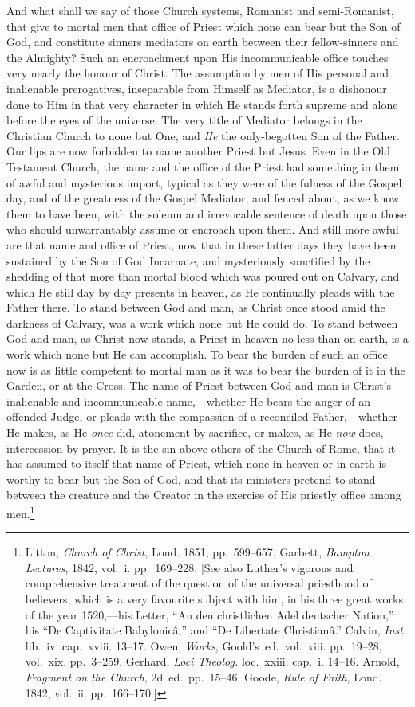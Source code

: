 \documentclass[
  english,
]{book}
\providecommand{\textlatin}{}
\renewcommand{\textlatin}[2][]{\foreignlanguage{latin}{#2}}
\newcommand{\textgerman}[2][]{\foreignlanguage{ngerman}{#2}}
\begin{document}
And what shall we say of those Church systems, Romanist and semi-Romanist, that give to mortal men that office of Priest which none can bear but the Son of God, and constitute sinners mediators on earth between their fellow-sinners and the Almighty? Such an encroachment upon His incommunicable office touches very nearly the honour of Christ. The assumption by men of His personal and inalienable prerogatives, inseparable from Himself as Mediator, is a dishonour done to Him in that very character in which He stands forth supreme and alone before the eyes of the universe. The very title of Mediator belongs in the Christian Church to none but One, and \emph{He} the only-begotten Son of the Father. Our lips are now forbidden to name another Priest but Jesus. Even in the Old Testament Church, the name and the office of the Priest had something in them of awful and mysterious import, typical as they were of the fulness of the Gospel day, and of the greatness of the Gospel Mediator, and fenced about, as we know them to have been, with the solemn and irrevocable sentence of death upon those who should unwarrantably assume or encroach upon them. And still more awful are that name and office of Priest, now that in these latter days they have been sustained by the Son of God Incarnate, and mysteriously sanctified by the shedding of that more than mortal blood which was poured out on Calvary, and which He still day by day presents in heaven, as He continually pleads with the Father there. To stand between God and man, as Christ once stood amid the darkness of Calvary, was a work which none but He could do. To stand between God and man, as Christ now stands, a Priest in heaven no less than on earth, is a work which none but He can accomplish. To bear the burden of such an office now is as little competent to mortal man as it was to bear the burden of it in the Garden, or at the Cross. The name of Priest between God and man is Christ's inalienable and incommunicable name,---whether He bears the anger of an offended Judge, or pleads with the compassion of a reconciled Father,---whether He makes, as He \emph{once} did, atonement by sacrifice, or makes, as He \emph{now} does, intercession by prayer. It is the sin above others of the Church of Rome, that it has assumed to itself that name of Priest, which none in heaven or in earth is worthy to bear but the Son of God, and that its ministers pretend to stand between the creature and the Creator in the exercise of His priestly office among men.\footnote{Litton, \emph{Church of Christ}, Lond. 1851, pp.~599--657. Garbett, \emph{Bampton Lectures}, 1842, vol.~i. pp.~169--228. {[}See also Luther's vigorous and comprehensive treatment of the question of the universal priesthood of believers, which is a very favourite subject with him, in his three great works of the year 1520,---his Letter, ``\textgerman{An den christlichen Adel deutscher Nation},'' his ``\textlatin{De Captivitate Babylonicâ},'' and ``\textlatin{De Libertate Christianâ}.'' Calvin, \emph{Inst.} lib.~iv. cap.~xviii. 13--17. Owen, \emph{Works}, Goold's~ed.~vol.~xiii. pp.~19--28, vol.~xix. pp.~3--259. Gerhard, \emph{Loci Theolog.} loc.~xxiii. cap.~i. 14--16. Arnold, \emph{Fragment on the Church}, 2d~ed.~pp.~15--46. Goode, \emph{Rule of Faith}, Lond. 1842, vol.~ii. pp.~166--170.{]}}
\end{document}
